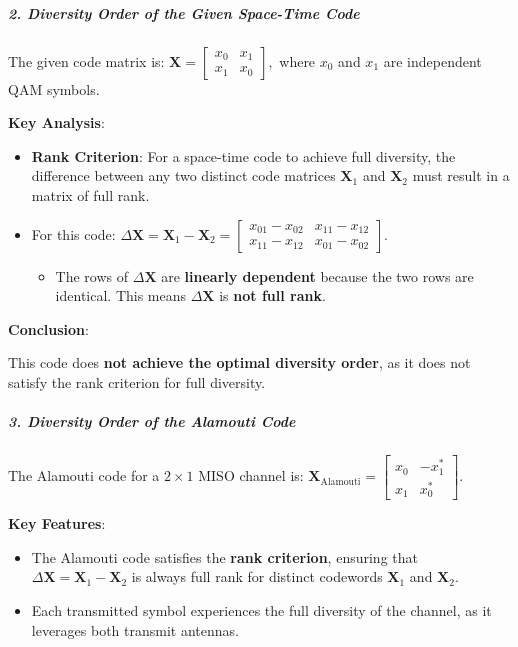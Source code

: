 \documentclass[11pt]{article}
\providecommand{\tightlist}{%
      \setlength{\itemsep}{0pt}\setlength{\parskip}{0pt}}
\begin{document}
\subparagraph{\texorpdfstring{\textbf{2. Diversity Order of the Given
Space-Time
Code}}{2. Diversity Order of the Given Space-Time Code}}\label{diversity-order-of-the-given-space-time-code}

The given code matrix is:
\(\mathbf{X} = \begin{bmatrix} x_0 & x_1 \\ x_1 & x_0 \end{bmatrix},\)
where \(x_0\) and \(x_1\) are independent QAM symbols.

\textbf{Key Analysis}:

\begin{itemize}
\tightlist
\item
  \textbf{Rank Criterion}: For a space-time code to achieve full
  diversity, the difference between any two distinct code matrices
  \(\mathbf{X}_1\) and \(\mathbf{X}_2\) must result in a matrix of full
  rank.
\item
  For this code:
  \(\Delta\mathbf{X} = \mathbf{X}_1 - \mathbf{X}_2 = \begin{bmatrix} x_{01} - x_{02} & x_{11} - x_{12} \\ x_{11} - x_{12} & x_{01} - x_{02} \end{bmatrix}.\)

  \begin{itemize}
  \tightlist
  \item
    The rows of \(\Delta\mathbf{X}\) are \textbf{linearly dependent}
    because the two rows are identical. This means \(\Delta\mathbf{X}\)
    is \textbf{not full rank}.
  \end{itemize}
\end{itemize}

\textbf{Conclusion}:

This code does \textbf{not achieve the optimal diversity order}, as it
does not satisfy the rank criterion for full diversity.

\subparagraph{\texorpdfstring{\textbf{3. Diversity Order of the Alamouti
Code}}{3. Diversity Order of the Alamouti Code}}\label{diversity-order-of-the-alamouti-code}

The Alamouti code for a \(2 \times 1\) MISO channel is:
\(\mathbf{X}_{\text{Alamouti}} = \begin{bmatrix} x_0 & -x_1^* \\ x_1 & x_0^* \end{bmatrix}.\)

\textbf{Key Features}:

\begin{itemize}
\tightlist
\item
  The Alamouti code satisfies the \textbf{rank criterion}, ensuring that
  \(\Delta\mathbf{X} = \mathbf{X}_1 - \mathbf{X}_2\) is always full rank
  for distinct codewords \(\mathbf{X}_1\) and \(\mathbf{X}_2\).
\item
  Each transmitted symbol experiences the full diversity of the channel,
  as it leverages both transmit antennas.
\end{itemize}
\end{document}
